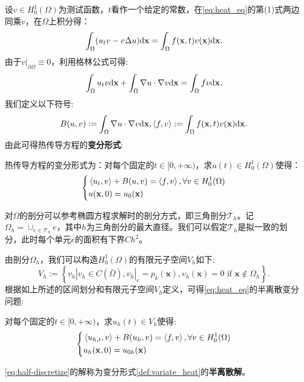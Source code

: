 设$v\in H_{0}^{1}(\Omega)$为测试函数，$t$看作一个给定的常数，在\eqref{eq:heat_eq}的第(1)式两边同乘$v$，在$\Omega$上积分得：
\begin{equation}
    \label{eq:int_test}
    \int_{\Omega}(u_{t}v-v\Delta u)\mathrm{d}\mathbf{x}=\int_{\Omega}f(\mathbf{x},t)v(\mathbf{x})\mathrm{d}\mathbf{x}.
\end{equation}
由于$v|_{\partial\Omega}\equiv 0$，利用格林公式可得:
\begin{equation}
    \int_{\Omega}u_{t}v\mathrm{d}\mathbf{x}+\int_{\Omega}\nabla u\cdot\nabla v\mathrm{d}\mathbf{x}=\int_{\Omega}fv\mathrm{d}\mathbf{x}.
\end{equation}
我们定义以下符号:
\begin{equation}
    B(u,v):=\int_{\Omega}\nabla u\cdot\nabla v\mathrm{d}\mathbf{x},\left<f,v\right>:=\int_{\Omega}f(\mathbf{x},t)v(\mathbf{x})\mathrm{d}\mathbf{x}.
\end{equation}
由此可得热传导方程的\textbf{变分形式}:
\begin{definition}
    \label{def:variate_heat}
    热传导方程的变分形式为：对每个固定的$t\in[0,+\infty)$，求$u(t)\in H_{0}^{1}(\Omega)$使得：
    \begin{equation}
        \left\{
            \begin{aligned}
                &\left<u_{t},v\right>+B(u,v)=\left<f,v\right>,\forall v\in H_{0}^{1}(\Omega)\\
                &u(\mathbf{x},0)=u_{0}(\mathbf{x})\\
            \end{aligned}
        \right.
    \end{equation}
\end{definition}
对$\Omega$的剖分可以参考椭圆方程求解时的剖分方式，即三角剖分$\mathcal{T}_{h}$。记$\Omega_{h}=\cup_{e\in\mathcal{T}_{h}}e$，其中$h$为三角剖分的最大直径。我们可以假定$\mathcal{T}_{h}$是拟一致的划分，此时每个单元$e$的面积有下界$Ch^{2}$。

由剖分$\Omega_{h}$，我们可以构造$H_{0}^{1}(\Omega)$的有限元子空间$V_{h}$如下:
\begin{equation}
    V_{h}:=\left\{v_{h}|v_{h}\in C(\bar\Omega),v_{h}|_{e}=p_{k}(\mathbf{x}),v_{h}(\mathbf{x})=0\text{ if }\mathbf{x}\notin\Omega_{h}\right\}.
\end{equation}
根据如上所述的区间划分和有限元子空间$V_{h}$定义，可得\eqref{eq:heat_eq}的半离散变分问题:
\begin{definition}
    \label{def:half-discretize_variate}
    对每个固定的$t\in [0,+\infty)$，求$u_{h}(t)\in V_{h}$使得:
    \begin{equation}
        \label{eq:half-discretize}
        \left\{
            \begin{aligned}
                &\left<u_{h,t},v\right>+B(u_{h},v)=\left<f,v\right>,\forall v\in H_{0}^{1}(\Omega)\\
                &u_{h}(\mathbf{x},0)=u_{0h}(\mathbf{x})\\
            \end{aligned}
        \right.        
    \end{equation}
\end{definition}
\eqref{eq:half-discretize}的解称为变分形式\ref{def:variate_heat}的\textbf{半离散解}。 

